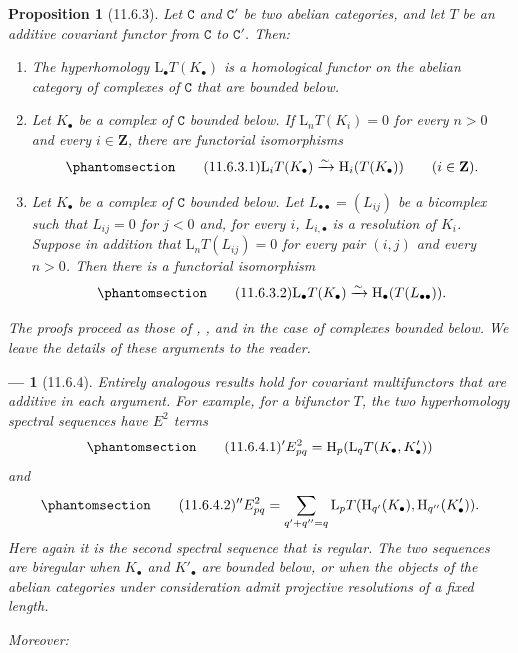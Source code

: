 \documentclass[oneside]{amsart}
\theoremstyle{ega-env-style}
\newtheorem*{env}{---}
\theoremstyle{ega-thm-env-style}
\newtheorem*{proposition}{Proposition}
\theoremstyle{ega-defn-env-style}
\def\bb{\mathbf}                    %
\def\cat{\mathtt}                   %
\def\HH{\mathrm{H}}                 %
\def\LL{\mathrm{L}}                 %
\def\simto{\xrightarrow{\sim}}
\newcommand{\oldpage}[2][]{{\marginnote{\normalfont{\textbf{#1}~|~#2}}}\ignorespaces}
\let\EGAOriginalLabel\label
\renewcommand{\label}[1]{\phantomsection\EGAOriginalLabel{#1}}
\begin{document}
\begin{proposition}[11.6.3]
\label{0.11.6.3}
Let $\cat{C}$ and $\cat{C}'$ be two abelian categories, and let $T$ be an additive covariant functor from $\cat{C}$ to $\cat{C}'$.
Then:
\begin{enumerate}
  \item[{\rm(i)}] \emph{The hyperhomology $\LL_\bullet T(K_\bullet)$ is a homological functor on the abelian category of complexes of $\cat{C}$ that are bounded below.}

  \item[{\rm(ii)}] \emph{Let $K_\bullet$ be a complex of $\cat{C}$ bounded below.
  If $\LL_nT(K_i)=0$ for every $n>0$ and every $i\in\bb{Z}$, there are functorial isomorphisms}
  \[
  \label{0.11.6.3.1}
  \tag{11.6.3.1}
    \LL_iT(K_\bullet)
    \simto
    \HH_i(T(K_\bullet))
    \qquad(i\in\bb{Z}).
  \]

  \item[{\rm(iii)}] \emph{Let $K_\bullet$ be a complex of $\cat{C}$ bounded below.
  Let $L_{\bullet\bullet}=(L_{ij})$ be a bicomplex such that $L_{ij}=0$ for $j<0$ and, for every $i$, $L_{i,\bullet}$ is a resolution of $K_i$.
  Suppose in addition that $\LL_nT(L_{ij})=0$ for every pair $(i,j)$ and every $n>0$.
  Then there is a functorial isomorphism}
  \[
  \label{0.11.6.3.2}
  \tag{11.6.3.2}
    \LL_\bullet T(K_\bullet)
    \simto
    \HH_\bullet(T(L_{\bullet\bullet})).
  \]
\end{enumerate}

The proofs proceed as those of , , and  in the case of complexes bounded below.
We leave the details of these arguments to the reader.
\end{proposition}

\begin{env}[11.6.4]
\label{0.11.6.4}
Entirely analogous results hold for covariant multifunctors that are additive in each argument.
For example, for a bifunctor $T$, the two hyperhomology spectral sequences have $E^2$ terms
\oldpage[0\textsubscript{III}]{41}
\[
\label{0.11.6.4.1}
\tag{11.6.4.1}
  {}'E^2_{pq}
  =\HH_p(\LL_qT(K_\bullet,K'_\bullet))
\]
and
\[
\label{0.11.6.4.2}
\tag{11.6.4.2}
  {}''E^2_{pq}
  =
  \sum_{q'+q''=q}
  \LL_pT(\HH_{q'}(K_\bullet),\HH_{q''}(K'_\bullet)).
\]
Here again it is the \emph{second} spectral sequence that is regular.
The two sequences are biregular when $K_\bullet$ and $K'_\bullet$ are bounded below, or when the objects of the abelian categories under consideration admit projective resolutions of a fixed length.

Moreover:
\end{env}
\end{document}
